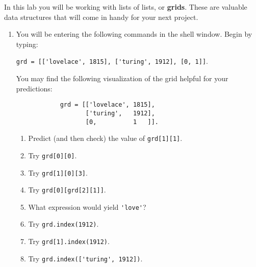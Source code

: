\documentclass[11pt, letterpaper, onecolumn, oneside, final]{article}
\begin{document}
\maketitle
In this lab you will be working with lists of lists, or \textbf{grids}. These are valuable data structures that will come in handy for your next project.
\begin{enumerate}
\item You will be entering the following commands in the shell window. Begin by typing:

\verb|grd = [['lovelace', 1815], ['turing', 1912], [0, 1]]|.

You may find the following visualization of the grid helpful for your predictions:
\begin{lstlisting}
            grd = [['lovelace', 1815], 
                   ['turing',   1912], 
                   [0,          1   ]].
\end{lstlisting}
\begin{enumerate}
    \item Predict (and then check) the value of \verb|grd[1][1]|.
    \item Try \verb|grd[0][0]|.
    \item Try \verb|grd[1][0][3]|.
    \item Try \verb|grd[0][grd[2][1]]|.
    \item What expression would yield \verb|'love'|?
    \item Try \verb|grd.index(1912)|. 
    \item Try \verb|grd[1].index(1912)|.
    \item Try \verb|grd.index(['turing', 1912])|.
\end{enumerate}


\end{enumerate}
\end{document}
